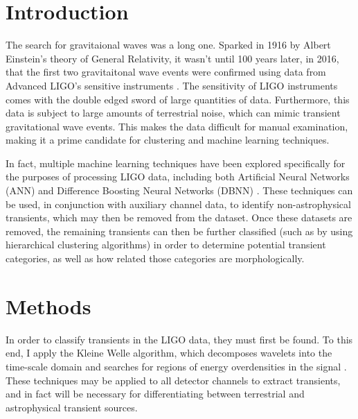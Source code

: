 \documentclass{article}
\begin{document}


\section{Introduction}
The search for gravitaional waves was a long one. Sparked in 1916 by Albert Einstein's theory of General Relativity, it wasn't until 100 years later, in 2016, that the first two gravitaitonal wave events were confirmed using data from Advanced LIGO's sensitive instruments \cite{TheLIGOScientificCollaboration2016} \cite{Abbott2016}. The sensitivity of LIGO instruments comes with the double edged sword of large quantities of data. Furthermore, this data is subject to large amounts of terrestrial noise, which can mimic transient gravitational wave events. This makes the data difficult for manual examination, making it a prime candidate for clustering and machine learning techniques.

In fact, multiple machine learning techniques have been explored specifically for the purposes of processing LIGO data, including both Artificial Neural Networks (ANN) \cite{Biswas2013} and Difference Boosting Neural Networks (DBNN) \cite{Mukund2016}. These techniques can be used, in conjunction with auxiliary channel data, to identify non-astrophysical transients, which may then be removed from the dataset. Once these datasets are removed, the remaining transients can then be further classified (such as by using hierarchical clustering algorithms) in order to determine potential transient categories, as well as how related those categories are morphologically.

\section{Methods}
In order to classify transients in the LIGO data, they must first be found. To this end, I apply the Kleine Welle algorithm, which decomposes wavelets into the time-scale domain and searches for regions of energy overdensities in the signal \cite{Biswas2013}\cite{Blackburn2007}. These techniques may be applied to all detector channels to extract transients, and in fact will be necessary for differentiating between terrestrial and astrophysical transient sources.
\end{document}
